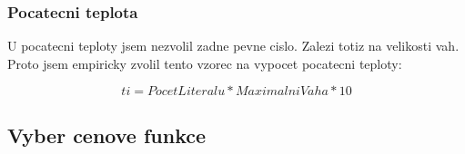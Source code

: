 \documentclass[12pt,a4paper]{article}
\begin{document}
\subsubsection{Pocatecni teplota}
U pocatecni teploty jsem nezvolil zadne pevne cislo. Zalezi totiz na velikosti vah. Proto jsem empiricky zvolil tento vzorec na vypocet pocatecni teploty:

$$ ti = PocetLiteralu * MaximalniVaha * 10 $$



\subsection{Vyber cenove funkce}








\end{document}
